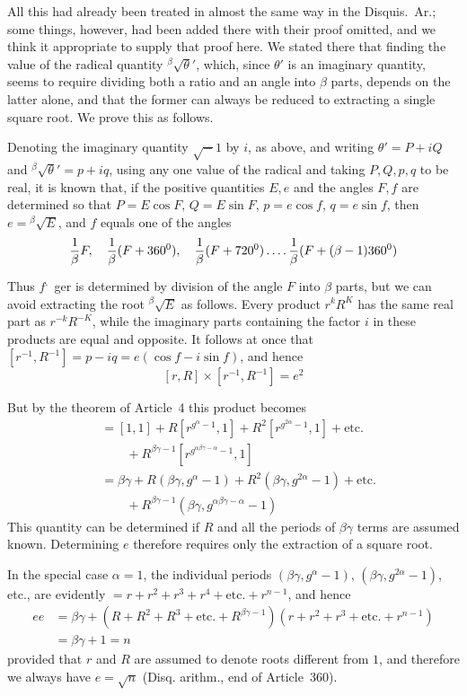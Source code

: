 \clearpage
{}
All this had already been treated in almost the same way in the Disquis.\ Ar.; some things, however, had been added there with their proof omitted, and we think it appropriate to supply that proof here. We stated there that finding the value of the radical quantity ${}^{\beta}\!\surd\theta'$, which, since $\theta'$ is an imaginary quantity, seems to require dividing both a ratio and an angle into $\beta$ parts, depends on the latter alone, and that the former can always be reduced to extracting a single square root. We prove this as follows.

Denoting the imaginary quantity $\surd-1$ by $i$, as above, and writing $\theta'=P+iQ$ and ${}^{\beta}\!\surd\theta'=p+iq$, using any one value of the radical and taking $P,Q,p,q$ to be real, it is known that, if the positive quantities $E,e$ and the angles $F,f$ are determined so that $P=E\cos F$, $Q=E\sin F$, $p=e\cos f$, $q=e\sin f$, then $e={}^{\beta}\!\surd E$, and $f$ equals one of the angles
\[
\frac1\beta F,\quad\frac1\beta(F+360^0),\quad\frac1\beta(F+720^0)\mathinner{.\,.\,.\,.}\frac1\beta(F+(\beta-1)360^0)
\]
Thus $f$\textsuperscript{.}\ ger is determined by division of the angle $F$ into $\beta$ parts, but we can avoid extracting the root ${}^{\beta}\!\surd E$ as follows. Every product $r^kR^K$ has the same real part as $r^{-k}R^{-K}$, while the imaginary parts containing the factor $i$ in these products are equal and opposite. It follows at once that $[r^{-1},R^{-1}]=p-iq=e(\cos f-i\sin f)$, and hence
\[
[r,R]\times[r^{-1},R^{-1}]=e^2
\]

But by the theorem of Article~4 this product becomes
\[
\begin{aligned}
&{}=[1,1]+R[r^{g^\alpha-1},1]+R^2[r^{g^{2\alpha}-1},1]+\text{etc.}\\
&\qquad{}+R^{\beta\gamma-1}[r^{g^{\alpha\beta\gamma-\alpha}-1},1]\\
&{}=\beta\gamma+R(\beta\gamma,g^\alpha-1)+R^2(\beta\gamma,g^{2\alpha}-1)+\text{etc.}\\
&\qquad{}+R^{\beta\gamma-1}(\beta\gamma,g^{\alpha\beta\gamma-\alpha}-1)
\end{aligned}
\]
This quantity can be determined if $R$ and all the periods of $\beta\gamma$ terms are assumed known. Determining $e$ therefore requires only the extraction of a square root.

In the special case $\alpha=1$, the individual periods $(\beta\gamma,g^\alpha-1)$, $(\beta\gamma,g^{2\alpha}-1)$, etc., are evidently $=r+r^2+r^3+r^4+\text{etc.}+r^{n-1}$, and hence
\[
\begin{aligned}
ee&=\beta\gamma+(R+R^2+R^3+\text{etc.}+R^{\beta\gamma-1})(r+r^2+r^3+\text{etc.}+r^{n-1})\\
&=\beta\gamma+1=n
\end{aligned}
\]
provided that $r$ and $R$ are assumed to denote roots different from $1$, and therefore we always have $e=\surd n$ (Disq. arithm., end of Article~360).

